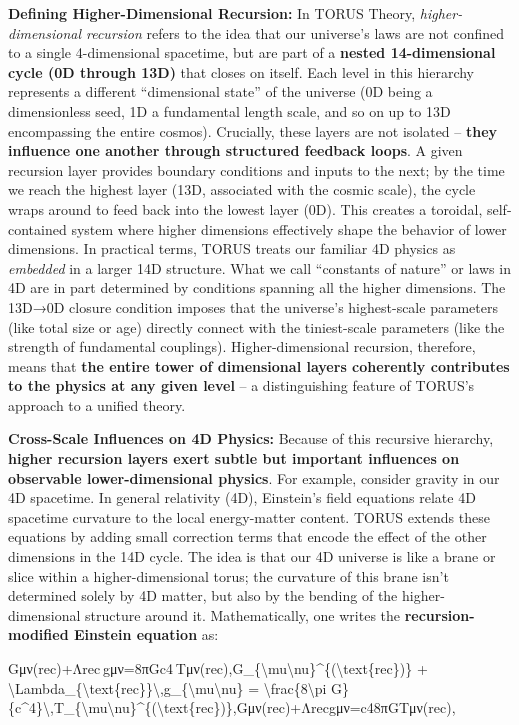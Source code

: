 \documentclass[
]{article}
\begin{document}
\textbf{Defining Higher-Dimensional Recursion:} In TORUS Theory,
\emph{higher-dimensional recursion} refers to the idea that our
universe's laws are not confined to a single 4-dimensional spacetime,
but are part of a \textbf{nested 14-dimensional cycle (0D through 13D)}
that closes on itself. Each level in this hierarchy represents a
different ``dimensional state'' of the universe (0D being a
dimensionless seed, 1D a fundamental length scale, and so on up to 13D
encompassing the entire cosmos). Crucially, these layers are not
isolated -- \textbf{they influence one another through structured
feedback loops}. A given recursion layer provides boundary conditions
and inputs to the next; by the time we reach the highest layer (13D,
associated with the cosmic scale), the cycle wraps around to feed back
into the lowest layer (0D). This creates a toroidal, self-contained
system where higher dimensions effectively shape the behavior of lower
dimensions. In practical terms, TORUS treats our familiar 4D physics as
\emph{embedded} in a larger 14D structure. What we call ``constants of
nature'' or laws in 4D are in part determined by conditions spanning all
the higher dimensions\hspace{0pt}. The 13D→0D closure condition imposes
that the universe's highest-scale parameters (like total size or age)
directly connect with the tiniest-scale parameters (like the strength of
fundamental couplings). Higher-dimensional recursion, therefore, means
that \textbf{the entire tower of dimensional layers coherently
contributes to the physics at any given level} -- a distinguishing
feature of TORUS's approach to a unified theory.

\textbf{Cross-Scale Influences on 4D Physics:} Because of this recursive
hierarchy, \textbf{higher recursion layers exert subtle but important
influences on observable lower-dimensional physics}. For example,
consider gravity in our 4D spacetime. In general relativity (4D),
Einstein's field equations relate 4D spacetime curvature to the local
energy-matter content. TORUS extends these equations by adding small
correction terms that encode the effect of the other dimensions in the
14D cycle. The idea is that our 4D universe is like a brane or slice
within a higher-dimensional torus; the curvature of this brane isn't
determined solely by 4D matter, but also by the bending of the
higher-dimensional structure around it. Mathematically, one writes the
\textbf{recursion-modified Einstein equation} as:

Gμν(rec)+Λrec gμν=8πGc4 Tμν(rec),G\_\{\textbackslash mu\textbackslash nu\}\^{}\{(\textbackslash text\{rec\})\}
+
\textbackslash Lambda\_\{\textbackslash text\{rec\}\}\textbackslash,g\_\{\textbackslash mu\textbackslash nu\}
= \textbackslash frac\{8\textbackslash pi
G\}\{c\^{}4\}\textbackslash,T\_\{\textbackslash mu\textbackslash nu\}\^{}\{(\textbackslash text\{rec\})\},Gμν(rec)\hspace{0pt}+Λrec\hspace{0pt}gμν\hspace{0pt}=c48πG\hspace{0pt}Tμν(rec)\hspace{0pt},
\end{document}
